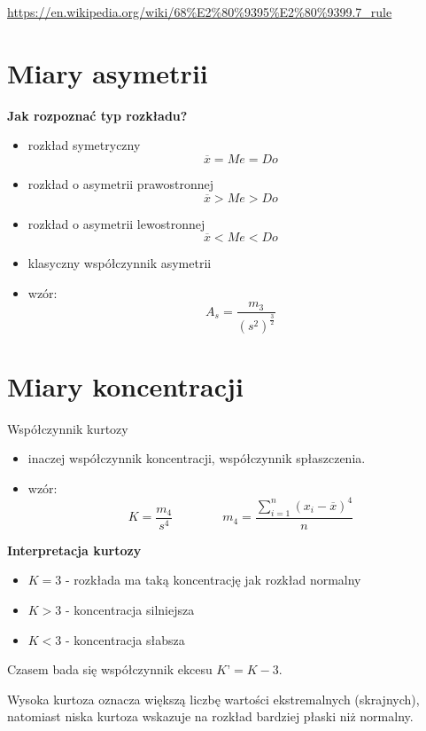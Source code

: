 \documentclass[
  polish,
  letterpaper,
  DIV=11,
  numbers=noendperiod]{scrreprt}
\providecommand{\tightlist}{%
  \setlength{\itemsep}{0pt}\setlength{\parskip}{0pt}}
\begin{document}
\url{https://en.wikipedia.org/wiki/68\%E2\%80\%9395\%E2\%80\%9399.7_rule}

\section{Miary asymetrii}\label{miary-asymetrii}

\textbf{Jak rozpoznać typ rozkładu?}

\begin{itemize}
\item
  rozkład symetryczny \[\overline{x} =Me=Do\]
\item
  rozkład o asymetrii prawostronnej \[\overline{x} >Me>Do\]
\item
  rozkład o asymetrii lewostronnej \[\overline{x}<Me<Do\]
\item
  klasyczny współczynnik asymetrii
\item
  wzór: \[A_s=\frac{m_3}{(s^2)^{\frac{3}{2}}}\]
\end{itemize}

\section{Miary koncentracji}\label{miary-koncentracji}

Współczynnik kurtozy

\begin{itemize}
\tightlist
\item
  inaczej współczynnik koncentracji, współczynnik spłaszczenia.
\item
  wzór:
  \[K=\frac{m_4}{s^4} \qquad \qquad m_4=\frac{\sum\limits_{i=1}^n (x_i-\overline{x})^4}{n}\]
\end{itemize}

\textbf{Interpretacja kurtozy}

\begin{itemize}
\tightlist
\item
  \(K=3\) - rozkłada ma taką koncentrację jak rozkład normalny
\item
  \(K>3\) - koncentracja silniejsza
\item
  \(K<3\) - koncentracja słabsza
\end{itemize}

Czasem bada się współczynnik ekcesu \(K’=K-3\).

Wysoka kurtoza oznacza większą liczbę wartości ekstremalnych
(skrajnych), natomiast niska kurtoza wskazuje na rozkład bardziej płaski
niż normalny.
\end{document}
